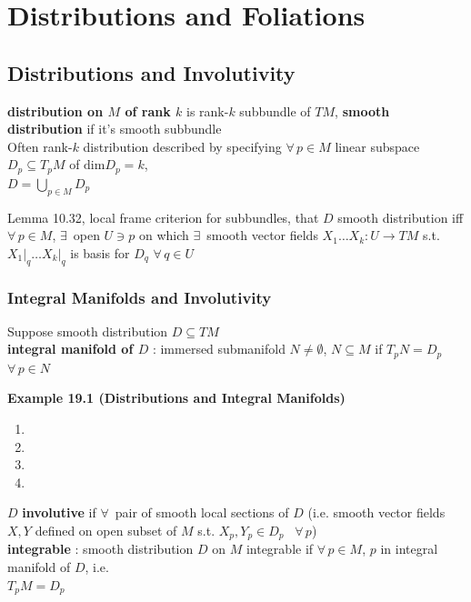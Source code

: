 \section{Distributions and Foliations}

\subsection*{Distributions and Involutivity}

\textbf{distribution on $M$ of rank $k$} is rank-$k$ subbundle of $TM$, \textbf{smooth distribution} if it's smooth subbundle \\
Often rank-$k$ distribution described by specifying $\forall \, p \in M$ linear subspace $D_p \subseteq T_pM$ of $\text{dim}D_p = k$, \\
\phantom{\quad \quad \,} $D = \bigcup_{p \in M} D_p$

Lemma 10.32, local frame criterion for subbundles, that $D$ smooth distribution iff $\forall \, p \in M$, $\exists \, $ open $U \ni p$ on which $\exists \, $ smooth vector fields $X_1 \dots X_k : U \to TM$ s.t. $\left. X_1 \right|_q \dots \left. X_k \right|_q$ is basis for $D_q$ $\forall \, q \in U$

\subsubsection*{Integral Manifolds and Involutivity}

Suppose smooth distribution $D \subseteq TM$ \\
\textbf{integral manifold of $D$} : immersed submanifold $N \neq \emptyset$, $N \subseteq M$ if $T_pN = D_p$ $\forall \, p \in N$

\textbf{Example 19.1 (Distributions and Integral Manifolds)}

\begin{enumerate}
\item[(a)] 
\item[(b)]
\item[(c)]
\item[(d)]
\end{enumerate}

$D$ \textbf{involutive} if $\forall \, $ pair of smooth local sections of $D$ (i.e. smooth vector fields $X,Y$ defined on open subset of $M$ s.t. $X_p, Y_p \in D_p$ \, $\forall \, p$) \\

\textbf{integrable} : smooth distribution $D$ on $M$ integrable if $\forall \, p \in M$, $p$ in integral manifold of $D$, i.e. \\
\phantom{\quad \quad \, } $T_p M = D_p$

